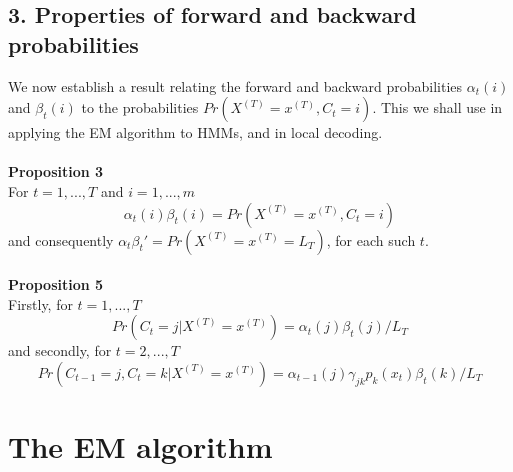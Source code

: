 \documentclass{article}
\begin{document}
\subsection*{3. Properties of forward and backward probabilities}

We now establish a result relating the forward and backward probabilities $\alpha_t(i)$ and $\beta_t(i)$ to the probabilities $Pr(X^{(T)} = x^{(T)}, C_t = i)$. This we shall use in applying the EM algorithm to HMMs, and in local decoding. \\
\\
\textbf{Proposition 3} \\
For $t = 1, ..., T$ and $i = 1, ..., m$
$$\alpha_t(i) \beta_t(i) = Pr(X^{(T)} = x^{(T)}, C_t = i)$$
and consequently $\alpha_t \beta_t' = Pr(X^{(T)} = x^{(T)} = L_T)$, for each such $t$. \\
\\
\textbf{Proposition 5} \\
Firstly, for $t = 1, ..., T$
$$Pr(C_t = j | X^{(T)} = x^{(T)}) = \alpha_t(j) \beta_t(j) / L_T$$
and secondly, for $t = 2, ..., T$
$$Pr(C_{t-1} = j, C_t = k | X^{(T)} = x^{(T)}) = \alpha_{t-1}(j) \gamma_{jk} p_k(x_t) \beta_t(k) / L_T$$

\section*{The EM algorithm}
\end{document}
